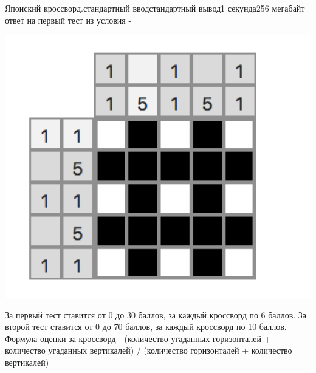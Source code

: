\begin{problem}{Японский кроссворд.}{стандартный ввод}{стандартный вывод}{1 секунда}{256 мегабайт}
\Note
ответ на первый тест из условия - 
\begin{center}
\includegraphics[width=15cm]{crossword.png}
\end{center}
За первый тест ставится от 0 до 30 баллов, за каждый кроссворд по 6 баллов.
За второй тест ставится от 0 до 70 баллов, за каждый кроссворд по 10 баллов.
Формула оценки за кроссворд - (количество угаданных горизонталей + количество угаданных вертикалей) /  (количество горизонталей + количество вертикалей)


\end{problem}

